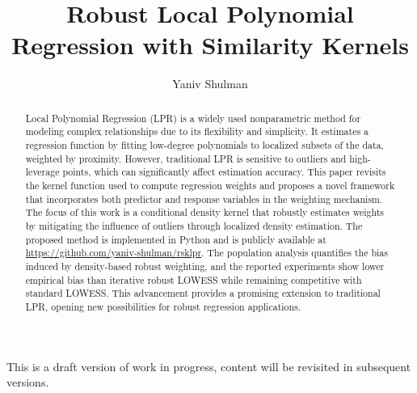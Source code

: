 \documentclass[preprint,1p,times,authoryear]{elsarticle}
\begin{document}
\begin{frontmatter}

\vspace*{\fill}
\begin{center}
This is a draft version of work in progress, content will be revisited in subsequent versions.
\end{center}
\vspace*{\fill}
 
\title{Robust Local Polynomial Regression with Similarity Kernels}
\author{Yaniv Shulman}


\begin{abstract}
Local Polynomial Regression (LPR) is a widely used nonparametric method for modeling complex relationships due to its flexibility and simplicity. It estimates a regression function by fitting low-degree polynomials to localized subsets of the data, weighted by proximity. However, traditional LPR is sensitive to outliers and high-leverage points, which can significantly affect estimation accuracy. This paper revisits the kernel function used to compute regression weights and proposes a novel framework that incorporates both predictor and response variables in the weighting mechanism. The focus of this work is a conditional density kernel that robustly estimates weights by mitigating the influence of outliers through localized density estimation. The proposed method is implemented in Python and is publicly available at \url{https://github.com/yaniv-shulman/rsklpr}. The population analysis quantifies the bias induced by density-based robust weighting, and the reported experiments show lower empirical bias than iterative robust LOWESS while remaining competitive with standard LOWESS. This advancement provides a promising extension to traditional LPR, opening new possibilities for robust regression applications.
\end{abstract}
\end{frontmatter}
\end{document}
